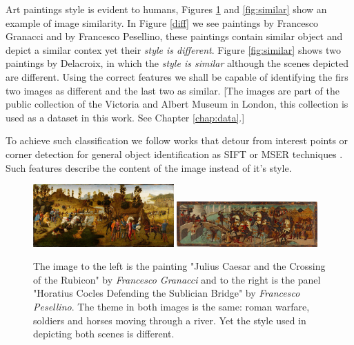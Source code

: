 \documentclass[11pt,a4paper,draft]{report}
\begin{document}
\begin{multicols}{2}
Art paintings style is evident to humans, Figures \ref{fig:diff} and
\ref{fig:similar} show an example of image similarity.  In Figure \ref{diff} we
see paintings by Francesco Granacci and by Francesco Pesellino, these paintings
contain similar object and depict a similar contex yet their \emph{style is
different}.  Figure \ref{fig:similar} shows two paintings by Delacroix, in
which the \emph{style is similar} although the scenes depicted are different.
Using the correct features we shall be capable of identifying the firs two
images as different and the last two as similar.  [The images are part of the
public collection of the Victoria and Albert Museum in London, this collection
is used as a dataset in this work.  See Chapter \ref{chap:data}.]

To achieve such classification we follow works that detour from interest points
or corner detection for general object identification as SIFT or MSER
techniques \cite{szel11book}.  Such features describe the content of the image
instead of it's style.

\begin{figure}[tb]  %
\centering
\includegraphics[width=0.48\textwidth]{diff_caesar}
\includegraphics[width=0.48\textwidth]{diff_horatius}
\caption[Example of different styles]{The image to the left is the painting
"Julius Caesar and the Crossing of the Rubicon" by \emph{Francesco Granacci}
and to the right is the panel "Horatius Cocles Defending the Sublician Bridge"
by \emph{Francesco Pesellino}.  The theme in both images is the same: roman
warfare, soldiers and horses moving through a river.  Yet the style used in
depicting both scenes is different.}
\label{fig:diff}
\end{figure}


\end{multicols}
\end{document}

